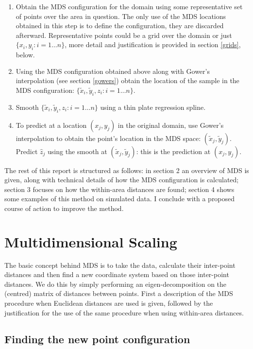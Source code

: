 \documentclass[a4paper,10pt]{article}
\begin{document}
\begin{enumerate}
\item Obtain the MDS configuration for the domain using some representative set of points over the area in question. The only use of the MDS locations obtained in this step is to define the configuration, they are discarded afterward. Representative points could be a grid over the domain or just $\{x_i, y_i : i=1\dots n\}$, more detail and justification is provided in section \ref{grids}, below.

\item Using the MDS configuration obtained above along with Gower's interpolation (see section \ref{gowers}) obtain the location of the sample in the MDS configuration: $\{\tilde{x}_i, \tilde{y}_i, z_i : i=1\dots n\}$.

\item Smooth $\{\tilde{x}_i, \tilde{y}_i, z_i : i=1\dots n\}$ using a thin plate regression spline.

\item To predict at a location $(x_j, y_j)$ in the original domain, use Gower's interpolation to 
obtain the point's location in the MDS space: $(\tilde{x}_j, \tilde{y}_j)$. Predict $\hat{z}_j$ using the smooth at $(\tilde{x}_j, \tilde{y}_j)$: this is the prediction at $(x_j, y_j)$.
\end{enumerate}

The rest of this report is structured as follows: in section 2 an overview of MDS is given, along with technical details of how the MDS configuration is calculated; section 3 focuses on how the within-area distances are found; section 4 shows some examples of this method on simulated data. I conclude with a proposed course of action to improve the method.

\section{Multidimensional Scaling}

The basic concept behind MDS is to take the data, calculate their inter-point distances and then find a new coordinate system based on those inter-point distances. We do this by simply performing an eigen-decomposition on the (centred) matrix of distances between points. First a description of the MDS procedure when Euclidean distances are used is given, followed by the justification for the use of the same procedure when using within-area distances.

\subsection{Finding the new point configuration}
\end{document}
